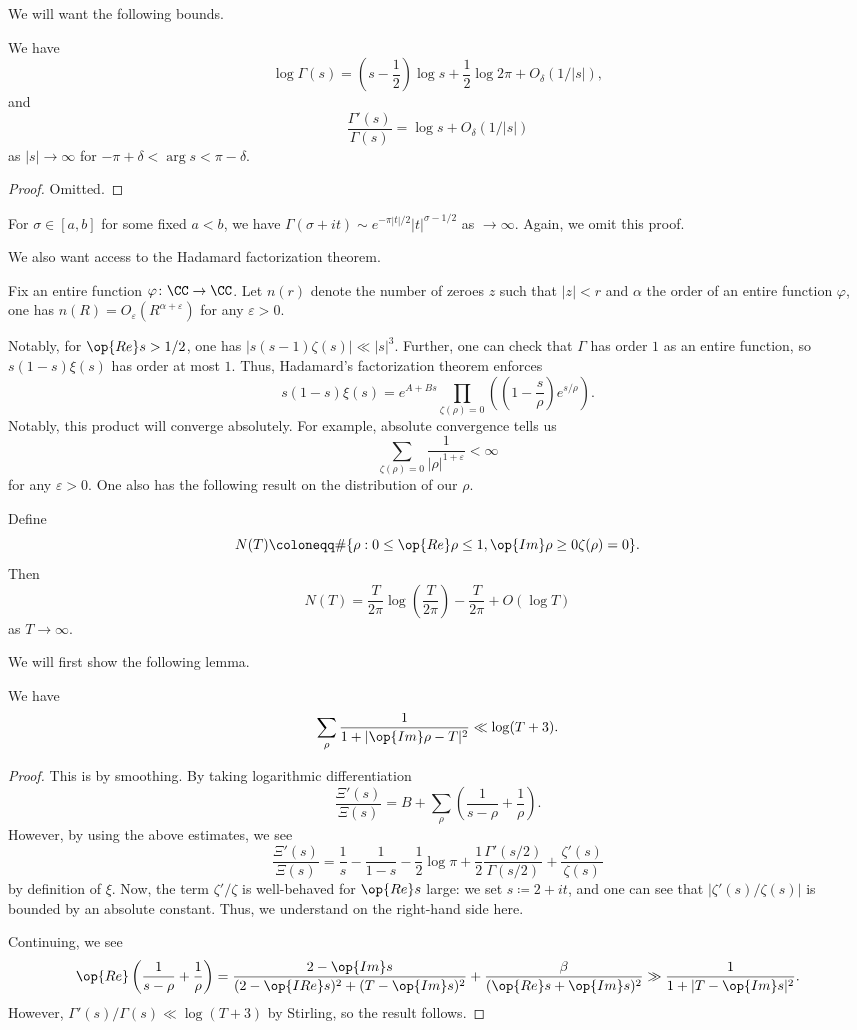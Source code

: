 \documentclass[../notes.tex]{subfiles}
\begin{document}
We will want the following bounds.
\begin{lemma}[Stirling]
	We have
	\[\log\Gamma(s)=\left(s-\frac12\right)\log s+\frac12\log2\pi+O_\delta(1/|s|),\]
	and
	\[\frac{\Gamma'(s)}{\Gamma(s)}=\log s+O_\delta(1/|s|)\]
	as $|s|\to\infty$ for $-\pi+\delta<\arg s<\pi-\delta$.
\end{lemma}
\begin{proof}
	Omitted.
\end{proof}
\begin{remark}
	For $\sigma\in[a,b]$ for some fixed $a<b$, we have $\Gamma(\sigma+it)\sim e^{-\pi|t|/2}|t|^{\sigma-1/2}$ as $\to\infty$. Again, we omit this proof.
\end{remark}
We also want access to the Hadamard factorization theorem.
\begin{theorem}
	Fix an entire function $\varphi\colon\CC\to\CC$. Let $n(r)$ denote the number of zeroes $z$ such that $|z|<r$ and $\alpha$ the order of an entire function $\varphi$, one has $n(R)=O_\varepsilon\left(R^{\alpha+\varepsilon}\right)$ for any $\varepsilon>0$.
\end{theorem}
Notably, for $\op{Re}s>1/2$, one has $|s(s-1)\zeta(s)|\ll|s|^3$. Further, one can check that $\Gamma$ has order $1$ as an entire function, so $s(1-s)\xi(s)$ has order at most $1$. Thus, Hadamard's factorization theorem enforces
\[s(1-s)\xi(s)=e^{A+Bs}\prod_{\zeta(\rho)=0}\left(\left(1-\frac s\rho\right)e^{s/\rho}\right).\]
Notably, this product will converge absolutely. For example, absolute convergence tells us
\[\sum_{\zeta(\rho)=0}\frac1{|\rho|^{1+\varepsilon}}<\infty\]
for any $\varepsilon>0$. One also has the following result on the distribution of our $\rho$.
\begin{theorem} \label{thm:num-zeroes-zeta}
	Define
	\[N(T)\coloneqq\#\{\rho:0\le\op{Re}\rho\le1,\op{Im}\rho\ge0\zeta(\rho)=0\}.\]
	Then
	\[N(T)=\frac T{2\pi}\log\left(\frac T{2\pi}\right)-\frac T{2\pi}+O(\log T)\]
	as $T\to\infty$.
\end{theorem}
We will first show the following lemma.
\begin{lemma} \label{lem:bound-zeroes}
	We have
	\[\sum_\rho\frac1{1+|\op{Im}\rho-T|^2}\ll\log(T+3).\]
\end{lemma}
\begin{proof}
	This is by smoothing. By taking logarithmic differentiation
	\[\frac{\Xi'(s)}{\Xi(s)}=B+\sum_\rho\left(\frac1{s-\rho}+\frac1\rho\right).\]
	However, by using the above estimates, we see
	\[\frac{\Xi'(s)}{\Xi(s)}=\frac1s-\frac1{1-s}-\frac12\log\pi+\frac12\frac{\Gamma'(s/2)}{\Gamma(s/2)}+\frac{\zeta'(s)}{\zeta(s)}\]
	by definition of $\xi$. Now, the term $\zeta'/\zeta$ is well-behaved for $\op{Re}s$ large: we set $s\coloneqq2+it$, and one can see that $|\zeta'(s)/\zeta(s)|$ is bounded by an absolute constant. Thus, we understand on the right-hand side here.

	Continuing, we see
	\[\op{Re}\left(\frac1{s-\rho}+\frac1\rho\right)=\frac{2-\op{Im}s}{(2-\op{IRe}s)^2+(T-\op{Im}s)^2}+\frac\beta{(\op{Re}s+\op{Im}s)^2}\gg\frac1{1+|T-\op{Im}s|^2}.\]
	However, $\Gamma'(s)/\Gamma(s)\ll\log(T+3)$ by Stirling, so the result follows.
\end{proof}
\end{document}

